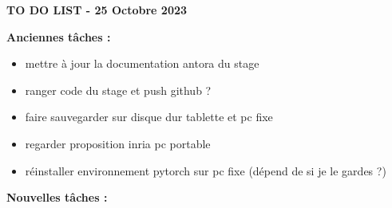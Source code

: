 \documentclass{article}
\begin{document}
	\begin{center}
		\Large\textbf{{TO DO LIST} - 25 Octobre 2023}
	\end{center}
	
	\textbf{Anciennes tâches :}
	
	\begin{itemize}[label=$\square$]
		\item mettre à jour la documentation antora du stage
		\item ranger code du stage et push github ?
		\item faire sauvegarder sur disque dur tablette et pc fixe
		\item regarder proposition inria pc portable
		\item réinstaller environnement pytorch sur pc fixe (dépend de si je le gardes ?)
	\end{itemize}
	
	\textbf{Nouvelles tâches :}
	
\end{document}
